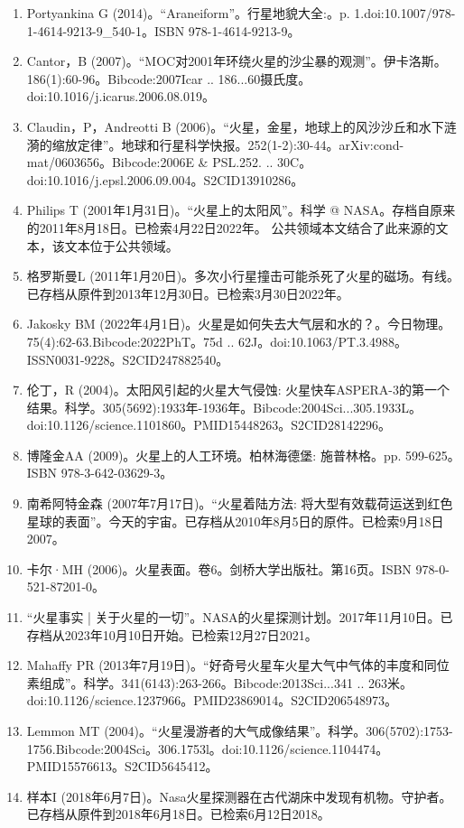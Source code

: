 \begin{enumerate}
\item Portyankina G (2014)。“Araneiform”。行星地貌大全:。p. 1.doi:10.1007/978-1-4614-9213-9_540-1。ISBN 978-1-4614-9213-9。
\item Cantor，B (2007)。“MOC对2001年环绕火星的沙尘暴的观测”。伊卡洛斯。186(1):60-96。Bibcode:2007Icar .. 186...60摄氏度。doi:10.1016/j.icarus.2006.08.019。
\item Claudin，P，Andreotti B (2006)。“火星，金星，地球上的风沙沙丘和水下涟漪的缩放定律”。地球和行星科学快报。252(1-2):30-44。arXiv:cond-mat/0603656。Bibcode:2006E & PSL.252. .. 30C。doi:10.1016/j.epsl.2006.09.004。S2CID13910286。 
\item Philips T (2001年1月31日)。“火星上的太阳风”。科学 @ NASA。存档自原来的2011年8月18日。已检索4月22日2022年。 公共领域本文结合了此来源的文本，该文本位于公共领域。
\item 格罗斯曼L (2011年1月20日)。多次小行星撞击可能杀死了火星的磁场。有线。已存档从原件到2013年12月30日。已检索3月30日2022年。
\item Jakosky BM (2022年4月1日)。火星是如何失去大气层和水的？。今日物理。75(4):62-63.Bibcode:2022PhT。75d .. 62J。doi:10.1063/PT.3.4988。ISSN0031-9228。S2CID247882540。  
\item 伦丁，R (2004)。太阳风引起的火星大气侵蚀: 火星快车ASPERA-3的第一个结果。科学。305(5692):1933年-1936年。Bibcode:2004Sci...305.1933L。doi:10.1126/science.1101860。PMID15448263。S2CID28142296。  
\item 博隆金AA (2009)。火星上的人工环境。柏林海德堡: 施普林格。pp. 599-625。ISBN 978-3-642-03629-3。
\item 南希阿特金森 (2007年7月17日)。“火星着陆方法: 将大型有效载荷运送到红色星球的表面”。今天的宇宙。已存档从2010年8月5日的原件。已检索9月18日2007。
\item 卡尔·MH (2006)。火星表面。卷6。剑桥大学出版社。第16页。ISBN 978-0-521-87201-0。
\item “火星事实 | 关于火星的一切”。NASA的火星探测计划。2017年11月10日。已存档从2023年10月10日开始。已检索12月27日2021。
\item Mahaffy PR (2013年7月19日)。“好奇号火星车火星大气中气体的丰度和同位素组成”。科学。341(6143):263-266。Bibcode:2013Sci...341 .. 263米。doi:10.1126/science.1237966。PMID23869014。S2CID206548973。  
\item Lemmon MT (2004)。“火星漫游者的大气成像结果”。科学。306(5702):1753-1756.Bibcode:2004Sci。306.1753l。doi:10.1126/science.1104474。PMID15576613。S2CID5645412。  
\item 样本I (2018年6月7日)。Nasa火星探测器在古代湖床中发现有机物。守护者。已存档从原件到2018年6月18日。已检索6月12日2018。

\end{enumerate}
